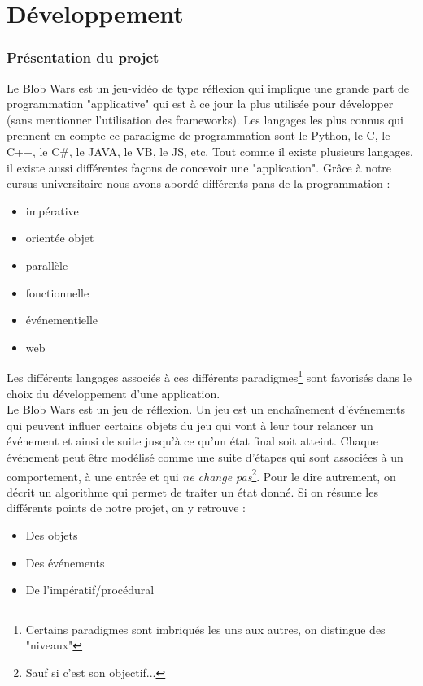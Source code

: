 \documentclass[11pt,a4paper]{article}
\begin{document}
\newpage
\part{Développement}
\setcounter{section}{0}


\section{Présentation du projet}

Le Blob Wars est un jeu-vidéo de type réflexion qui implique une grande part de programmation "applicative" qui est à ce jour la plus utilisée pour développer (sans mentionner l'utilisation des frameworks). Les langages les plus connus qui prennent en compte ce paradigme de programmation sont le Python, le C, le C++, le C\#, le JAVA, le VB, le JS, etc. Tout comme il existe plusieurs langages, il existe aussi différentes façons de concevoir une "application". Grâce à notre cursus universitaire nous avons abordé différents pans de la programmation :
\begin{itemize}
    \item impérative
    \item orientée objet
    \item parallèle
    \item fonctionnelle
    \item événementielle
    \item web
\end{itemize}

\vspace{10px}

Les différents langages associés à ces différents paradigmes\footnote{Certains paradigmes sont imbriqués les uns aux autres, on distingue des "niveaux"} sont favorisés dans le choix du développement d'une application.\\

Le Blob Wars est un jeu de réflexion. Un jeu est un enchaînement d'événements qui peuvent influer certains objets du jeu qui vont à leur tour relancer un événement et ainsi de suite jusqu'à ce qu'un état final soit atteint. Chaque événement peut être modélisé comme une suite d'étapes qui sont associées à un comportement, à une entrée et qui \textit{ne change pas}\footnote{Sauf si c'est son objectif...}. Pour le dire autrement, on décrit un algorithme qui permet de traiter un état donné. Si on résume les différents points de notre projet, on y retrouve :

\begin{itemize}
    \item Des objets
    \item Des événements
    \item De l'impératif/procédural
\end{itemize}
\end{document}
